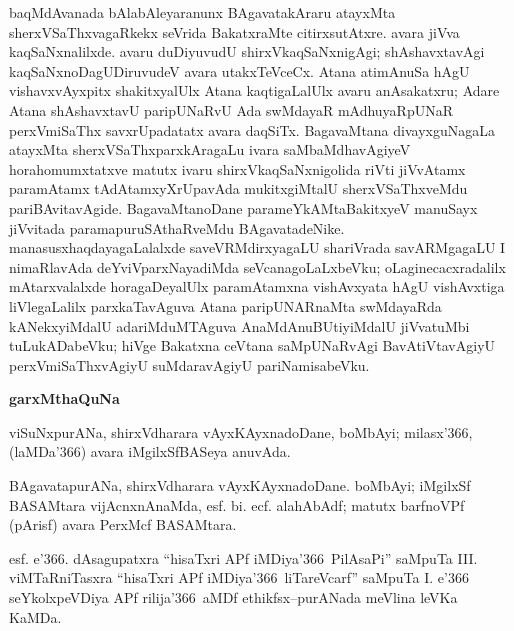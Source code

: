 baqMdAvanada bAlabAleyaranunx BAgavatakAraru atayxMta sherxVSaThxvagaRkekx seVrida BakatxraMte citirxsutAtxre. avara jiVva kaqSaNxnalilxde. avaru duDiyuvudU shirxVkaqSaNxnigAgi; shAshavxtavAgi kaqSaNxnoDagUDiruvudeV avara utakxTeVceCx. Atana atimAnuSa hAgU vishavxvAyxpitx shakitxyalUlx Atana kaqtigaLalUlx avaru anAsakatxru; Adare Atana shAshavxtavU paripUNaRvU Ada swMdayaR mAdhuyaRpUNaR perxVmiSaThx savxrUpadatatx avara daqSiTx. BagavaMtana divayxguNagaLa atayxMta sherxVSaThxparxkAragaLu ivara saMbaMdhavAgiyeV hora\break\-homumxtatxve matutx ivaru shirxVkaqSaNxnigolida riVti jiVvAtamx paramAtamx tAdAtamxyX\-rUpa\-vAda mukitxgiMtalU sherxVSaThxveMdu pariBAvitavAgide. BagavaMtanoDane parameYkAMta\break BakitxyeV manuSayx jiVvitada paramapuruSAthaRveMdu BAgavatadeNike. manasusx\break haqdayagaLalalxde saveVRMdirxyagaLU shariVrada savARMgagaLU I nimaRlavAda deYviV\-parxNayadiMda seVcanagoLaLxbeVku; oLaginecacxradalilx mAtarxvalalxde horagaDeyalUlx para\-mAtamxna vishAvxyata hAgU vishAvxtiga liVlegaLalilx parxkaTavAguva Atana paripUNARnaMta swMdayaRda kANekxyiMdalU adariMduMTAguva AnaMdAnuBUtiyiMdalU jiVvatuMbi tuLukADabeVku; hiVge Bakatxna ceVtana saMpUNaRvAgi BavAtiVtavAgiyU perxVmiSaThxvAgiyU suMdaravAgiyU pariNamisabeVku. 

\theendnotes
{}

\vskip 1cm

\begin{center}
{\Large\bf garxMthaQuNa}
\end{center}

\smallskip
viSuNxpurANa, shirxVdharara vAyxKAyxnadoDane, boMbAyi; milasx\char'366, (laMDa\char'366) avara iMgilxSfBASeya anuvAda.

\smallskip
BAgavatapurANa, shirxVdharara vAyxKAyxnadoDane. boMbAyi; iMgilxSf BASAMtara vijAcnxnAnaMda, esf. bi. ecf. alahAbAdf; matutx barfnoVPf (pArisf) avara PerxMcf BASAMtara.

\smallskip
esf. e\char'366. dAsagupatxra ``hisaTxri APf iMDiya\char'366\ PilAsaPi'' saMpuTa {\rm III.} viMTaRniTasxra ``hisaTxri APf iMDiya\char'366\ liTareVcarf'' saMpuTa {\rm I.} e\char'366 seYkolxpeVDiya APf rilija\char'366\ aMDf ethikfsx--purANada meVlina leVKa KaMDa.
